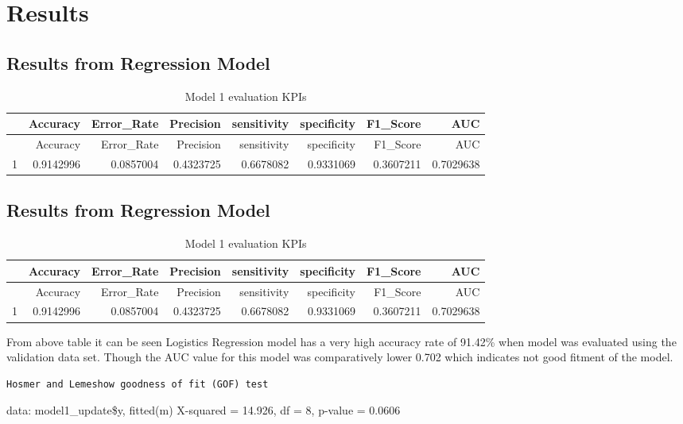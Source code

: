 \documentclass[english,floatsintext,man]{apa6}
\begin{document}
\section{Results}\label{results}

\subsection{Results from Regression
Model}\label{results-from-regression-model}

\begin{longtable}[c]{@{}lrrrrrrr@{}}
\caption{Model 1 evaluation KPIs}\tabularnewline
\toprule
& Accuracy & Error\_Rate & Precision & sensitivity & specificity &
F1\_Score & AUC\tabularnewline
\midrule
\endfirsthead
\toprule
& Accuracy & Error\_Rate & Precision & sensitivity & specificity &
F1\_Score & AUC\tabularnewline
\midrule
\endhead
1 & 0.9142996 & 0.0857004 & 0.4323725 & 0.6678082 & 0.9331069 &
0.3607211 & 0.7029638\tabularnewline
\bottomrule
\end{longtable}

\subsection{Results from Regression
Model}\label{results-from-regression-model-1}

\begin{longtable}[c]{@{}lrrrrrrr@{}}
\caption{Model 1 evaluation KPIs}\tabularnewline
\toprule
& Accuracy & Error\_Rate & Precision & sensitivity & specificity &
F1\_Score & AUC\tabularnewline
\midrule
\endfirsthead
\toprule
& Accuracy & Error\_Rate & Precision & sensitivity & specificity &
F1\_Score & AUC\tabularnewline
\midrule
\endhead
1 & 0.9142996 & 0.0857004 & 0.4323725 & 0.6678082 & 0.9331069 &
0.3607211 & 0.7029638\tabularnewline
\bottomrule
\end{longtable}

From above table it can be seen Logistics Regression model has a very
high accuracy rate of 91.42\% when model was evaluated using the
validation data set. Though the AUC value for this model was
comparatively lower 0.702 which indicates not good fitment of the model.

\begin{verbatim}
Hosmer and Lemeshow goodness of fit (GOF) test
\end{verbatim}

data: model1\_update\$y, fitted(m) X-squared = 14.926, df = 8, p-value =
0.0606
\end{document}
